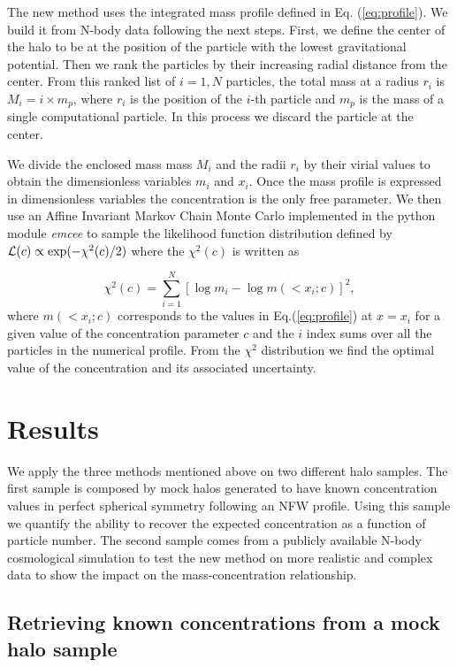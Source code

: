 \documentclass[a4,useAMS,usenatbib,usegraphicx]{mn2e}
\begin{document}
The new method uses the integrated mass profile defined in
Eq. (\ref{eq:profile}).
We build it from N-body data following the next steps.
First, we define the center of the halo to be at the position of the
particle with the lowest gravitational potential.  
Then we rank the particles by their increasing radial distance from
the center. 
From this ranked list of $i=1,N$ particles, the total mass at a radius
$r_i$ is $M_i=i\times m_p$, where $r_i$ is the position of the $i$-th
particle and $m_p$ is the mass of a single computational particle. 
In this process we discard the particle at the center. 

We divide the enclosed mass mass $M_i$ and the radii $r_i$ by their
virial values to obtain the dimensionless variables $m_i$ and $x_i$.
Once the mass profile is expressed in dimensionless variables the
concentration is the only free parameter. 
We then use an Affine Invariant Markov Chain Monte Carlo implemented in the
python module {\em emcee} \citep{emcee} to sample the likelihood
function distribution defined by ${\cal L}(c)\propto
\exp(-\chi^2(c)/2)$ where the $\chi^2(c)$ is 
written as

\begin{equation}
\chi^2(c)= \sum_{i=1}^{N}[\log m_i - \log m(< x_i;c)]^2,
\end{equation}
%
where $m(<x_i;c)$ corresponds to the values in Eq.(\ref{eq:profile})
at $x=x_i$ for a given value of the concentration parameter $c$ and
the $i$ index sums over all the particles in the numerical profile.
From the $\chi^2$ distribution we find the optimal value of the
concentration and its associated uncertainty.


\section{Results}
\label{sec:results}

We apply the three methods mentioned above on two different halo
samples.
The first sample is composed by mock halos generated to have known
concentration values in perfect spherical symmetry following an NFW
profile.    
Using this sample we quantify the ability to recover the expected
concentration as a function of particle number. 
The second sample comes from a publicly available N-body cosmological
simulation to test the new method on more realistic and complex data
to show the impact on the mass-concentration relationship.


\subsection{Retrieving known concentrations from a mock halo sample}
\end{document}
